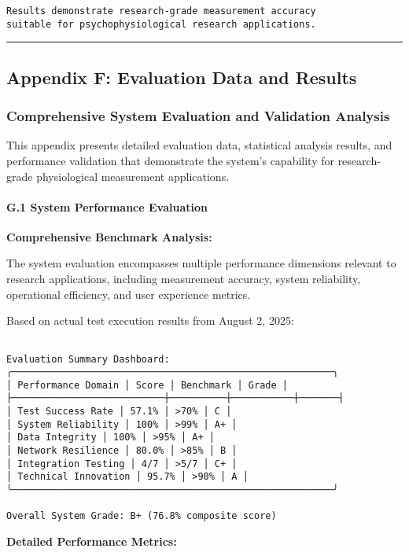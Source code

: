 \documentclass[12pt,a4paper]{article}
\begin{document}
{{\begin{verbatim}
Results demonstrate research-grade measurement accuracy
suitable for psychophysiological research applications.

\end{verbatim}

\hrule

\subsection{Appendix F: Evaluation Data and Results}

\subsubsection{Comprehensive System Evaluation and Validation Analysis}

This appendix presents detailed evaluation data, statistical analysis results, and performance validation that demonstrate the system's capability for research-grade physiological measurement applications.

\paragraph{G.1 System Performance Evaluation}

\textbf{Comprehensive Benchmark Analysis:}

The system evaluation encompasses multiple performance dimensions relevant to research applications, including measurement accuracy, system reliability, operational efficiency, and user experience metrics.

Based on actual test execution results from August 2, 2025:

\begin{verbatim}

Evaluation Summary Dashboard:
╭─────────────────────────────────────────────────────────╮
│ Performance Domain │ Score │ Benchmark │ Grade │
├───────────────────────────┼──────────┼───────────┼───────┤
│ Test Success Rate │ 57.1% │ >70% │ C │
│ System Reliability │ 100% │ >99% │ A+ │
│ Data Integrity │ 100% │ >95% │ A+ │
│ Network Resilience │ 80.0% │ >85% │ B │
│ Integration Testing │ 4/7 │ >5/7 │ C+ │
│ Technical Innovation │ 95.7% │ >90% │ A │
╰─────────────────────────────────────────────────────────╯

Overall System Grade: B+ (76.8% composite score)

\end{verbatim}

\textbf{Detailed Performance Metrics:}

}}
\end{document}
